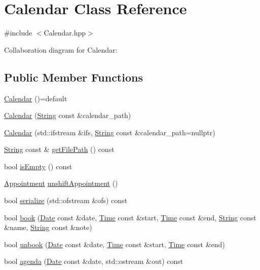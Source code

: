 \hypertarget{classCalendar}{}\section{Calendar Class Reference}
\label{classCalendar}


{\ttfamily \#include $<$Calendar.\+hpp$>$}



Collaboration diagram for Calendar\+:
\subsection*{Public Member Functions}
\begin{DoxyCompactItemize}
\item 
\hyperlink{classCalendar_a568f7ef431263d9667286aebac96febf}{Calendar} ()=default
\item 
\hyperlink{classCalendar_a54d7e31f38979ee7a363594b86ca9419}{Calendar} (\hyperlink{classString}{String} const \&calendar\+\_\+path)
\item 
\hyperlink{classCalendar_a346673cf7dd15ffa3a2ea292703c5421}{Calendar} (std\+::ifstream \&ifs, \hyperlink{classString}{String} const \&calendar\+\_\+path=nullptr)
\item 
\hyperlink{classString}{String} const  \& \hyperlink{classCalendar_afb5265ef3f8b820048d35dc9921d6789}{get\+File\+Path} () const
\item 
bool \hyperlink{classCalendar_a304110c0454b23f75902ddcddbe8a921}{is\+Empty} () const
\item 
\hyperlink{classAppointment}{Appointment} \hyperlink{classCalendar_a6c94f89713fac92f1544ea3f1b9a8fc9}{unshift\+Appointment} ()
\item 
bool \hyperlink{classCalendar_abd08c73fde62b83cb12afe01ff574223}{serialize} (std\+::ofstream \&ofs) const
\item 
bool \hyperlink{classCalendar_ac50220dec77b2c19f09516ea88e9398c}{book} (\hyperlink{classDate}{Date} const \&date, \hyperlink{classTime}{Time} const \&start, \hyperlink{classTime}{Time} const \&end, \hyperlink{classString}{String} const \&name, \hyperlink{classString}{String} const \&note)
\item 
bool \hyperlink{classCalendar_a24540f159572a53109a20be9ea8f4c5e}{unbook} (\hyperlink{classDate}{Date} const \&date, \hyperlink{classTime}{Time} const \&start, \hyperlink{classTime}{Time} const \&end)
\item 
bool \hyperlink{classCalendar_ac6112aa4e9b3e6e5b9a478ff66789d77}{agenda} (\hyperlink{classDate}{Date} const \&date, std\+::ostream \&out) const

\end{DoxyCompactItemize}
